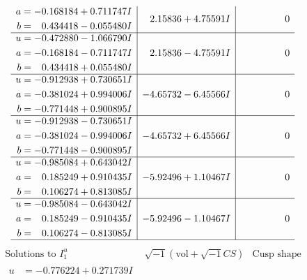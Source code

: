 \documentclass[1p]{elsarticle_modified}
\theoremstyle{definition}
\newcommand{\I}{\sqrt{-1}}
\begin{document}
$$\begin{array}{c|c|c}
\begin{aligned}
a &= -0.168184 + 0.711747 I \\
b &= \phantom{-}0.434418 - 0.055480 I\end{aligned}
 & \phantom{-}2.15836 + 4.75591 I & \phantom{-0.000000 } 0 \\ \hline\begin{aligned}
u &= -0.472880 - 1.066790 I \\
a &= -0.168184 - 0.711747 I \\
b &= \phantom{-}0.434418 + 0.055480 I\end{aligned}
 & \phantom{-}2.15836 - 4.75591 I & \phantom{-0.000000 } 0 \\ \hline\begin{aligned}
u &= -0.912938 + 0.730651 I \\
a &= -0.381024 + 0.994006 I \\
b &= -0.771448 + 0.900895 I\end{aligned}
 & -4.65732 - 6.45566 I & \phantom{-0.000000 } 0 \\ \hline\begin{aligned}
u &= -0.912938 - 0.730651 I \\
a &= -0.381024 - 0.994006 I \\
b &= -0.771448 - 0.900895 I\end{aligned}
 & -4.65732 + 6.45566 I & \phantom{-0.000000 } 0 \\ \hline\begin{aligned}
u &= -0.985084 + 0.643042 I \\
a &= \phantom{-}0.185249 + 0.910435 I \\
b &= \phantom{-}0.106274 + 0.813085 I\end{aligned}
 & -5.92496 + 1.10467 I & \phantom{-0.000000 } 0 \\ \hline\begin{aligned}
u &= -0.985084 - 0.643042 I \\
a &= \phantom{-}0.185249 - 0.910435 I \\
b &= \phantom{-}0.106274 - 0.813085 I\end{aligned}
 & -5.92496 - 1.10467 I & \phantom{-0.000000 } 0\\
 \hline 
 \end{array}$$\newpage$$\begin{array}{c|c|c}  
\text{Solutions to }I^u_{1}& \I (\text{vol} + \sqrt{-1}CS) & \text{Cusp shape}\\
 \hline 
\begin{aligned}
u &= -0.776224 + 0.271739 I \\

\end{aligned}
\end{array}$$
\end{document}
